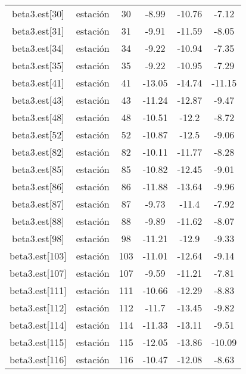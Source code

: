 \begin{table}[]
\begin{tabular}{cccccc}
beta3.est{[}30{]}     & estación             & 30     & -8.99  & -10.76 & -7.12   \\
beta3.est{[}31{]}     & estación             & 31     & -9.91  & -11.59 & -8.05   \\
beta3.est{[}34{]}     & estación             & 34     & -9.22  & -10.94 & -7.35   \\
beta3.est{[}35{]}     & estación             & 35     & -9.22  & -10.95 & -7.29   \\
beta3.est{[}41{]}     & estación             & 41     & -13.05 & -14.74 & -11.15  \\
beta3.est{[}43{]}     & estación             & 43     & -11.24 & -12.87 & -9.47   \\
beta3.est{[}48{]}     & estación             & 48     & -10.51 & -12.2  & -8.72   \\
beta3.est{[}52{]}     & estación             & 52     & -10.87 & -12.5  & -9.06   \\
beta3.est{[}82{]}     & estación             & 82     & -10.11 & -11.77 & -8.28   \\
beta3.est{[}85{]}     & estación             & 85     & -10.82 & -12.45 & -9.01   \\
beta3.est{[}86{]}     & estación             & 86     & -11.88 & -13.64 & -9.96   \\
beta3.est{[}87{]}     & estación             & 87     & -9.73  & -11.4  & -7.92   \\
beta3.est{[}88{]}     & estación             & 88     & -9.89  & -11.62 & -8.07   \\
beta3.est{[}98{]}     & estación             & 98     & -11.21 & -12.9  & -9.33   \\
beta3.est{[}103{]}    & estación             & 103    & -11.01 & -12.64 & -9.14   \\
beta3.est{[}107{]}    & estación             & 107    & -9.59  & -11.21 & -7.81   \\
beta3.est{[}111{]}    & estación             & 111    & -10.66 & -12.29 & -8.83   \\
beta3.est{[}112{]}    & estación             & 112    & -11.7  & -13.45 & -9.82   \\
beta3.est{[}114{]}    & estación             & 114    & -11.33 & -13.11 & -9.51   \\
beta3.est{[}115{]}    & estación             & 115    & -12.05 & -13.86 & -10.09  \\
beta3.est{[}116{]}    & estación             & 116    & -10.47 & -12.08 & -8.63   \\

\end{tabular}
\end{table}

